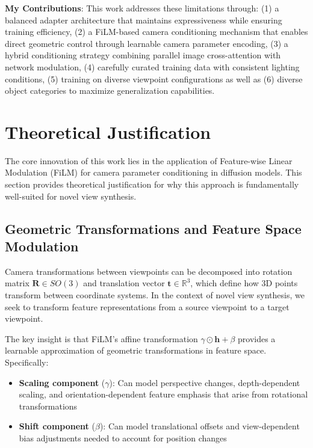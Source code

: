 \textbf{My Contributions}: This work addresses these limitations through: (1) a balanced adapter architecture that maintains expressiveness while ensuring training efficiency, (2) a FiLM-based camera conditioning mechanism that enables direct geometric control through learnable camera parameter encoding, (3) a hybrid conditioning strategy combining parallel image cross-attention with network modulation, (4) carefully curated training data with consistent lighting conditions, (5) training on diverse viewpoint configurations as well as (6) diverse object categories to maximize generalization capabilities.

\section{Theoretical Justification}\label{sec:theoretical-justification}

The core innovation of this work lies in the application of Feature-wise Linear Modulation (FiLM) for camera parameter conditioning in diffusion models. This section provides theoretical justification for why this approach is fundamentally well-suited for novel view synthesis.

\subsection{Geometric Transformations and Feature Space Modulation}

Camera transformations between viewpoints can be decomposed into rotation matrix $\mathbf{R} \in SO(3)$ and translation vector $\mathbf{t} \in \mathbb{R}^3$, which define how 3D points transform between coordinate systems. In the context of novel view synthesis, we seek to transform feature representations from a source viewpoint to a target viewpoint.

The key insight is that FiLM's affine transformation $\gamma \odot \mathbf{h} + \beta$ provides a learnable approximation of geometric transformations in feature space. Specifically:

\begin{itemize}
  \item \textbf{Scaling component} ($\gamma$): Can model perspective changes, depth-dependent scaling, and orientation-dependent feature emphasis that arise from rotational transformations
  \item \textbf{Shift component} ($\beta$): Can model translational offsets and view-dependent bias adjustments needed to account for position changes
\end{itemize}

